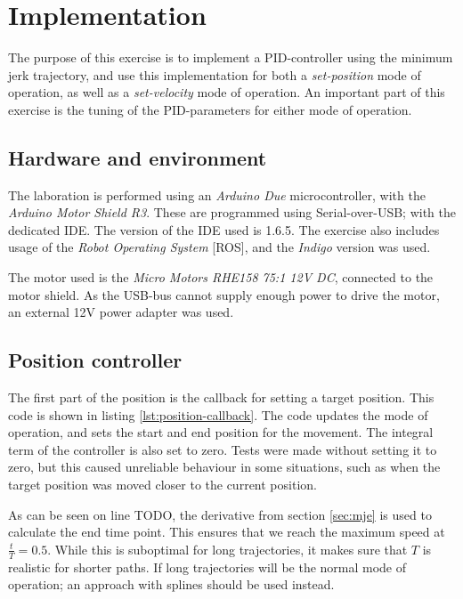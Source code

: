 \documentclass[11pt]{article}
\begin{document}
\section{Implementation}
The purpose of this exercise is to implement a PID-controller using the minimum jerk trajectory, and use this implementation for both a \emph{set-position} mode of operation, as well as a \emph{set-velocity} mode of operation. An important part of this exercise is the tuning of the PID-parameters for either mode of operation. \par

\subsection{Hardware and environment}
The laboration is performed using an \emph{Arduino Due} microcontroller, with the \emph{Arduino Motor Shield R3}. These are programmed using Serial-over-USB; with the dedicated IDE. The version of the IDE used is 1.6.5. The exercise also includes usage of the \emph{Robot Operating System} [ROS], and the \emph{Indigo} version was used. \par

The motor used is the \emph{Micro Motors RHE158 75:1 12V DC}, connected to the motor shield. As the USB-bus cannot supply enough power to drive the motor, an external 12V power adapter was used. 
\subsection{Position controller}
The first part of the position is the callback for setting a target position. This code is shown in listing \vref{lst:position-callback}. The code updates the mode of operation, and sets the start and end position for the movement. The integral term of the controller is also set to zero. Tests were made without setting it to zero, but this caused unreliable behaviour in some situations, such as when the target position was moved closer to the current position. \par

As can be seen on line TODO, the derivative from section \vref{sec:mje} is used to calculate the end time point. This ensures that we  reach the maximum speed at $\frac{t}{T} = 0.5$. While this is suboptimal for long trajectories, it makes sure that $T$ is realistic for shorter paths. If long trajectories will be the normal mode of operation; an approach with splines should be used instead. \par
\end{document}
